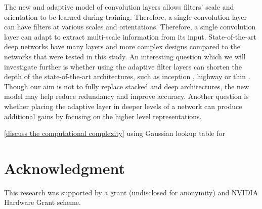 \documentclass{bmvc2k}
\begin{document}
The new and adaptive model of convolution layers allows filters' scale and orientation to be learned during training. Therefore, a single convolution layer can have filters at various scales and orientations. Therefore, a single convolution layer can adapt to extract multi-scale information from its input. State-of-the-art deep networks have many layers and more complex designs compared to the networks that were tested in this study. An interesting question which we will investigate further is whether using the adaptive filter layers can shorten the depth of the state-of-the-art architectures, such as inception \cite{inceptionv1}, highway \cite{highway} or thin \cite{fitnets}. Though our aim is not to fully replace stacked and deep architectures, the new model may help reduce redundancy and improve accuracy. Another question is whether placing the adaptive layer in deeper levels of a network can produce additional gains by focusing on the higher level representations.

\ref{discuss the computational complexity} using Gaussian lookup table for 


\section{Acknowledgment}
\label{sec:ack}
This research was supported by a grant (undisclosed for anonymity) and NVIDIA Hardware Grant scheme.


\end{document}
